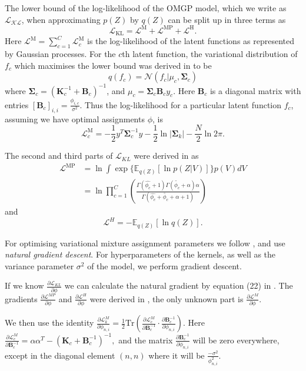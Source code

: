 The lower bound of the log-likelihood of the OMGP model, which we write as $ \mathcal{L_{\text{KL}}} $, when approximating $ p(Z) $ by $ q(Z) $ can be split up in three terms as
\[
\mathcal{L}_{\text{KL}} = \mathcal{L}^{\text{M}} + \mathcal{L}^{\text{MP}} + \mathcal{L}^{\text{H}}.
\]
Here $ \mathcal{L}^{\text{M}} = \sum_{c=1}^C \mathcal{L}^{\text{M}}_c $ is the log-likelihood of the latent functions as represented by Gaussian processes. For the $ c $th latent function, the variational distribution of $ f_c $ which maximises the lower bound was derived in \cite{Lazaro-Gredilla2012-ta} to be
\[
q(f_c) = \mathcal{N}(f_c | \mu_c, \bm{\Sigma}_c)
\]
where $ \bm{\Sigma}_c = (\bm{K}_c^{-1} + \bm{B}_c)^{-1}$, and $ \mu_c = \bm{\Sigma}_c \bm{B}_c y_c $. Here $ \bm{B}_c $ is a diagonal matrix with entries $ [\bm{B}_c]_{i,i} = \frac{\phi_{i, c}}{\sigma^2}. $ Thus the log-likelihood for a particular latent function $ f_c $, assuming we have optimal assignments $ \phi $, is
\[
\mathcal{L}^{\text{M}}_c = -\frac{1}{2} y^T \bm{\Sigma}_c^{-1} y - \frac{1}{2} \ln |\bm{\Sigma}_k| - \frac{N}{2} \ln 2 \pi.
\]

The second and third parts of $ \mathcal{L}_{KL} $ were derived in \cite{Hensman2015-op} as
\begin{align*}
\mathcal{L}^{\text{MP}} &=
\ln \int \exp \{ \mathbb{E}_{q(Z)} \left[ \ln p( Z | V ) \right] \} p(V) dV \\ 
& = \ln \prod_{c=1}^{C} \left(
\frac{\Gamma(\hat{\phi_c} + 1) \Gamma(\tilde{\phi_c} + \alpha) \alpha}
{\Gamma(\hat{\phi_c} + \tilde{\phi_c} + \alpha + 1)}
\right)
\end{align*}
and
\[
\mathcal{L}^{H} = - \mathbb{E}_{q(Z)} \left[ \ln q( Z ) \right].
\]

For optimising variational mixture assignment parameters we follow \cite{Hensman2012-kr}, and use \textit{natural gradient descent}. For hyperparameters of the kernels, as well as the variance parameter $ \sigma^2 $ of the model, we perform gradient descent.

If we know $ \frac{\partial \mathcal{L}_{KL}}{\partial \phi} $ we can calculate the natural gradient by equation (22) in \cite{Hensman2015-op}. The gradients $ \frac{\partial \mathcal{L}^{MP}}{\partial \phi} $ and $ \frac{\partial \mathcal{L}^{H}}{\partial \phi} $ were derived in \cite{Hensman2015-op}, the only unknown part is $ \frac{\partial \mathcal{L}^{M}}{\partial \phi} $.

We then use the identity $ \frac{\partial \mathcal{L}^{M}_k}{\partial \phi_{n, i}} =
\frac{1}{2} \text{Tr} \left( \frac{\partial \mathcal{L}^{M}_c}{\partial \bm{B}_c^{-1}} \cdot
\frac{\partial \bm{B}_c^{-1}}{\partial \phi_{n, i}} \right) $.
Here $ \frac{\partial \mathcal{L}^{M}_c}{\partial \bm{B}_c^{-1}} =
\alpha \alpha^T  - (\bm{K}_c + \bm{B}_c^{-1})^{-1}, $
and the matrix $ \frac{\partial \bm{B}_c^{-1}}{\partial \phi_{n, i}} $ will be zero everywhere, except in the diagonal element $ (n, n) $ where it will be $ \frac{-\sigma^2}{\phi_{n, i}^2} $.

